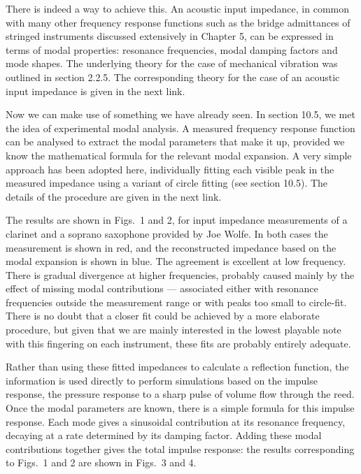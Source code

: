   There is indeed a way to achieve this. An acoustic input impedance, in common 
  with many other frequency response functions such as the bridge admittances 
  of stringed instruments discussed extensively in Chapter 5, can be expressed 
  in terms of modal properties: resonance frequencies, modal damping factors 
  and mode shapes. The underlying theory for the case of mechanical vibration 
  was outlined in section 2.2.5. The corresponding theory for the case of an 
  acoustic input impedance is given in the next link. 

  Now we can make use of something we have already seen. In section 10.5, we 
  met the idea of experimental modal analysis. A measured frequency response 
  function can be analysed to extract the modal parameters that make it up, 
  provided we know the mathematical formula for the relevant modal expansion. A 
  very simple approach has been adopted here, individually fitting each visible 
  peak in the measured impedance using a variant of circle fitting (see section 
  10.5). The details of the procedure are given in the next link. 

  The results are shown in Figs.\ 1 and 2, for input impedance measurements of 
  a clarinet and a soprano saxophone provided by Joe Wolfe. In both cases the 
  measurement is shown in red, and the reconstructed impedance based on the 
  modal expansion is shown in blue. The agreement is excellent at low 
  frequency. There is gradual divergence at higher frequencies, probably caused 
  mainly by the effect of missing modal contributions — associated either with 
  resonance frequencies outside the measurement range or with peaks too small 
  to circle-fit. There is no doubt that a closer fit could be achieved by a 
  more elaborate procedure, but given that we are mainly interested in the 
  lowest playable note with this fingering on each instrument, these fits are 
  probably entirely adequate. 

  Rather than using these fitted impedances to calculate a reflection function, 
  the information is used directly to perform simulations based on the impulse 
  response, the pressure response to a sharp pulse of volume flow through the 
  reed. Once the modal parameters are known, there is a simple formula for this 
  impulse response. Each mode gives a sinusoidal contribution at its resonance 
  frequency, decaying at a rate determined by its damping factor. Adding these 
  modal contributions together gives the total impulse response: the results 
  corresponding to Figs.\ 1 and 2 are shown in Figs.\ 3 and 4. 


